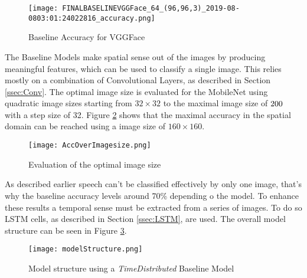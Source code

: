 %

\begin{figure}
  \centering
  \texttt{[image: FINALBASELINEVGGFace\_64\_(96,96,3)\_2019-08-0803:01:24022816\_accuracy.png]}
  \caption{Baseline Accuracy for VGGFace}
  \label{fig:baseAccVGGFace}
\end{figure}



The Baseline Models make spatial sense out of the images by producing meaningful features, which can be used to classify a single image.
This relies mostly on a combination of Convolutional Layers, as described in Section \ref{ssec:Conv}.
The optimal image size is evaluated for the MobileNet using quadratic image sizes starting from $32 \times 32$ to the maximal image size of $200 \time 200$ with a step size of 32.
Figure \ref{fig:AccOverImagesize} shows that the maximal accuracy in the spatial domain can be reached using a image size of $160 \times 160$.
\begin{figure}
  \centering
  \texttt{[image: AccOverImagesize.png]}
  \caption{Evaluation of the optimal image size}
  \label{fig:AccOverImagesize}
\end{figure}


As described earlier speech can't be classified effectively by only one image, that's why the baseline accuracy levels around 70\% depending o the model.
To enhance these results a temporal sense must be extracted from a series of images.
To do so LSTM cells, as described in Section \ref{ssec:LSTM}, are used.
The overall model structure can be seen in Figure \ref{fig:model}.

\begin{figure}
  \centering
  \texttt{[image: modelStructure.png]}
  \caption{Model structure using a \emph{TimeDistributed} Baseline Model}
  \label{fig:model}
\end{figure}

